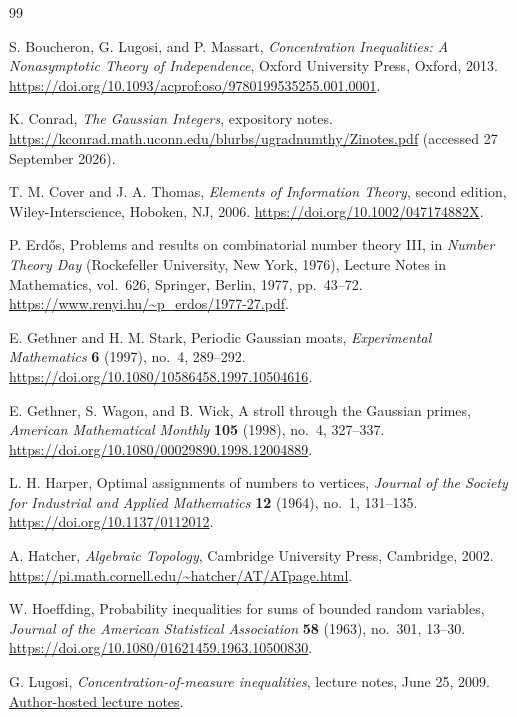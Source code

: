 \begin{thebibliography}{99}

S. Boucheron, G. Lugosi, and P. Massart,
\emph{Concentration Inequalities: A Nonasymptotic Theory of Independence},
Oxford University Press, Oxford, 2013.
\url{https://doi.org/10.1093/acprof:oso/9780199535255.001.0001}.

K. Conrad, \emph{The Gaussian Integers}, expository notes.
\url{https://kconrad.math.uconn.edu/blurbs/ugradnumthy/Zinotes.pdf}
(accessed 27 September 2026).

T. M. Cover and J. A. Thomas,
\emph{Elements of Information Theory}, second edition,
Wiley-Interscience, Hoboken, NJ, 2006.
\url{https://doi.org/10.1002/047174882X}.

P. Erd\H{o}s,
Problems and results on combinatorial number theory III,
in \emph{Number Theory Day} (Rockefeller University, New York, 1976),
Lecture Notes in Mathematics, vol.~626,
Springer, Berlin, 1977, pp.~43--72.
\url{https://www.renyi.hu/~p_erdos/1977-27.pdf}.

E. Gethner and H. M. Stark,
Periodic Gaussian moats,
\emph{Experimental Mathematics} \textbf{6} (1997), no.~4, 289--292.
\url{https://doi.org/10.1080/10586458.1997.10504616}.

E. Gethner, S. Wagon, and B. Wick,
A stroll through the Gaussian primes,
\emph{American Mathematical Monthly} \textbf{105} (1998), no.~4, 327--337.
\url{https://doi.org/10.1080/00029890.1998.12004889}.

L. H. Harper,
Optimal assignments of numbers to vertices,
\emph{Journal of the Society for Industrial and Applied Mathematics}
\textbf{12} (1964), no.~1, 131--135.
\url{https://doi.org/10.1137/0112012}.

A. Hatcher, \emph{Algebraic Topology},
Cambridge University Press, Cambridge, 2002.
\url{https://pi.math.cornell.edu/~hatcher/AT/ATpage.html}.

W. Hoeffding,
Probability inequalities for sums of bounded random variables,
\emph{Journal of the American Statistical Association}
\textbf{58} (1963), no.~301, 13--30.
\url{https://doi.org/10.1080/01621459.1963.10500830}.

G. Lugosi, \emph{Concentration-of-measure inequalities},
lecture notes, June 25, 2009.
\href{https://www.upf.edu/documents/298368705/0/anu.pdf/7c62a169-bd53-4c93-b192-d1a75373ce40?t=1745790909783}{Author-hosted lecture notes}.


\end{thebibliography}
